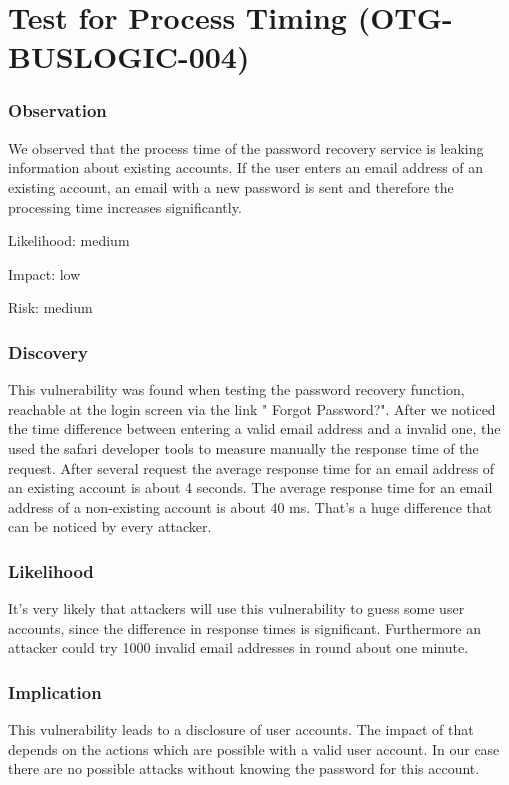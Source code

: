 \chapter{Test for Process Timing (OTG-BUSLOGIC-004)}
\subsection{Observation}
	We observed that the process time of the password recovery service is leaking information about existing accounts.
	If the user enters an email address of an existing account, an email with a new password is sent and therefore the processing time increases significantly.


Likelihood: medium \newline

Impact: low\newline

Risk: medium\newline

\subsection{Discovery}
This vulnerability was found when testing the password recovery function, reachable at the login screen via the link " Forgot Password?".
After we noticed the time difference between entering a valid email address and a invalid one, the used the safari developer tools to measure manually the response time of the request. After several request the average response time for an email address of an existing account is about 4 seconds. The  average response time for an email address of a non-existing account is about 40 ms. That's a huge difference that can be noticed by every attacker.



\subsection{Likelihood}
It's very likely that attackers will use this vulnerability to guess some user accounts, since the difference in response times is significant. Furthermore an attacker could try 1000 invalid email addresses in round about one minute. 

\subsection{Implication} 
This vulnerability leads to a disclosure of user accounts. The impact of that depends on the actions which are possible with a valid user account. In our case there are no possible attacks without knowing the password for this account.


